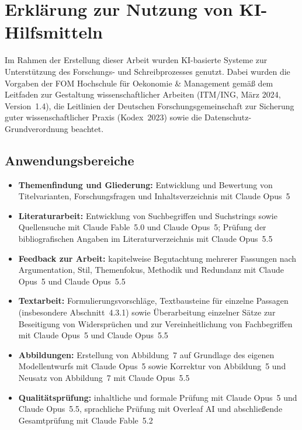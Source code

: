 \newpage
{}
{}
\section*{Erkl\"arung zur Nutzung von KI-Hilfsmitteln}

Im Rahmen der Erstellung dieser Arbeit wurden KI-basierte Systeme zur Unterst\"utzung des Forschungs- und Schreibprozesses genutzt. Dabei wurden die Vorgaben der FOM Hochschule f\"ur Oekonomie \& Management gem\"a{\ss} dem Leitfaden zur Gestaltung wissenschaftlicher Arbeiten (ITM/ING, M\"arz 2024, Version~1.4), die Leitlinien der Deutschen Forschungsgemeinschaft zur Sicherung guter wissenschaftlicher Praxis (Kodex~2023) sowie die Datenschutz-Grundverordnung beachtet.

\subsection*{Anwendungsbereiche}

\begin{itemize}[leftmargin=1.5em]
	\item \textbf{Themenfindung und Gliederung:} Entwicklung und Bewertung von Titelvarianten, Forschungsfragen und Inhaltsverzeichnis mit Claude Opus~5
	\item \textbf{Literaturarbeit:} Entwicklung von Suchbegriffen und Suchstrings sowie Quellensuche mit Claude Fable~5.0 und Claude Opus~5; Pr\"ufung der bibliografischen Angaben im Literaturverzeichnis mit Claude Opus~5.5
	\item \textbf{Feedback zur Arbeit:} kapitelweise Begutachtung mehrerer Fassungen nach Argumentation, Stil, Themenfokus, Methodik und Redundanz mit Claude Opus~5 und Claude Opus~5.5
	\item \textbf{Textarbeit:} Formulierungsvorschl\"age, Textbausteine f\"ur einzelne Passagen (insbesondere Abschnitt~4.3.1) sowie \"Uberarbeitung einzelner S\"atze zur Beseitigung von Widerspr\"uchen und zur Vereinheitlichung von Fachbegriffen mit Claude Opus~5 und Claude Opus~5.5
	\item \textbf{Abbildungen:} Erstellung von Abbildung~7 auf Grundlage des eigenen Modellentwurfs mit Claude Opus~5 sowie Korrektur von Abbildung~5 und Neusatz von Abbildung~7 mit Claude Opus~5.5
	\item \textbf{Qualit\"atspr\"ufung:} inhaltliche und formale Pr\"ufung mit Claude Opus~5 und Claude Opus~5.5, sprachliche Pr\"ufung mit Overleaf AI und abschlie{\ss}ende Gesamtpr\"ufung mit Claude Fable~5.2
\end{itemize}

